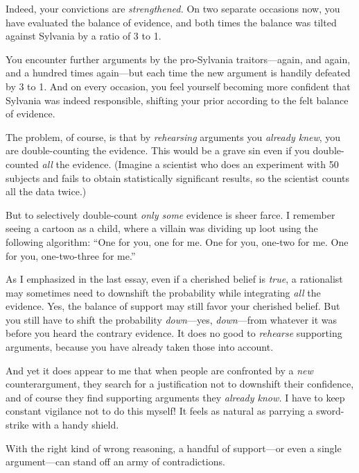 {
 Indeed, your convictions are \textit{strengthened.} On two
separate occasions now, you have evaluated the balance of evidence, and
both times the balance was tilted against Sylvania by a ratio of 3 to
1.}

{
 You encounter further arguments by the pro-Sylvania
traitors---again, and again, and a hundred times again---but each time
the new argument is handily defeated by 3 to 1. And on every occasion,
you feel yourself becoming more confident that Sylvania was indeed
responsible, shifting your prior according to the felt balance of
evidence.}

{
 The problem, of course, is that by \textit{rehearsing} arguments
you \textit{already knew}, you are double-counting the evidence. This
would be a grave sin even if you double-counted \textit{all} the
evidence. (Imagine a scientist who does an experiment with 50 subjects
and fails to obtain statistically significant results, so the scientist
counts all the data twice.)}

{
 But to selectively double-count \textit{only some} evidence is
sheer farce. I remember seeing a cartoon as a child, where a villain
was dividing up loot using the following algorithm:
``One for you, one for me. One for you, one-two for
me. One for you, one-two-three for me.''}

{
 As I emphasized in the last essay, even if a cherished belief is
\textit{true}, a rationalist may sometimes need to downshift the
probability while integrating \textit{all} the evidence. Yes, the
balance of support may still favor your cherished belief. But you still
have to shift the probability \textit{down}{}---yes,
\textit{down}{}---from whatever it was before you heard the contrary
evidence. It does no good to \textit{rehearse} supporting arguments,
because you have already taken those into account.}

{
 And yet it does appear to me that when people are confronted by a
\textit{new} counterargument, they search for a justification not to
downshift their confidence, and of course they find supporting
arguments they \textit{already know.} I have to keep constant vigilance
not to do this myself! It feels as natural as parrying a sword-strike
with a handy shield.}

{
 With the right kind of wrong reasoning, a handful of support---or
even a single argument---can stand off an army of contradictions.}

\myendsectiontext


